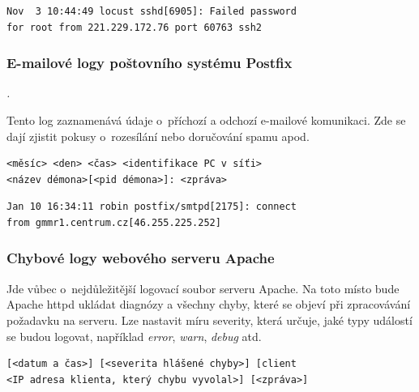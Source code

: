 \documentclass[thesis=B,czech]{FITthesis}[2012/06/26]
\begin{document}
\begin{lstlisting}[frame=single,caption=
Příklad události (viz \texttt{auth.log}),label=exampleAUTH]
Nov  3 10:44:49 locust sshd[6905]: Failed password 
for root from 221.229.172.76 port 60763 ssh2
\end{lstlisting}
 
\subsubsection{E-mailové logy poštovního systému Postfix}
\textit{.} \cite{bpLacina}
 
Tento log zaznamenává údaje o~příchozí a odchozí e-mailové komunikaci.
Zde se dají zjistit pokusy o~rozesílání nebo doručování spamu apod.
 	
\begin{lstlisting}[frame=single,caption=Formát události e-mailového logu poštovního systému Postfix \cite{bpLacina},label=formatMAIL]
<měsíc> <den> <čas> <identifikace PC v síťi> 
<název démona>[<pid démona>]: <zpráva>
\end{lstlisting}


\begin{lstlisting}[frame=single,caption=Příklad události doslova převzaný z~\cite{bpLacina},label=exampleMAIL]
Jan 10 16:34:11 robin postfix/smtpd[2175]: connect 
from gmmr1.centrum.cz[46.255.225.252]
\end{lstlisting}

\subsubsection{Chybové logy webového serveru Apache}
Jde vůbec o~nejdůležitější logovací soubor serveru Apache. Na toto místo bude Apache httpd ukládat diagnózy a všechny chyby, které se objeví při zpracovávání požadavku na serveru. Lze nastavit míru severity, která určuje, jaké typy událostí se budou logovat, například \textit{error}, \textit{warn}, \textit{debug} atd. \cite{logFiles}

\begin{lstlisting}[frame=single,caption=Formát události z~chybového logu serveru Apache \cite{logFiles},label=formatAPACHE_ERROR]
[<datum a čas>] [<severita hlášené chyby>] [client 
<IP adresa klienta, který chybu vyvolal>] [<zpráva>]
\end{lstlisting}
\end{document}
